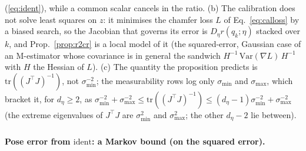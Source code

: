 \documentclass{article}
\newcommand{\ident}{\mathrm{ident}}
\newcommand{\ph}{\textsuperscript{\dag}}
\begin{document}
(\ref{eq:ident}), while a common scalar cancels in the ratio. (b) The calibration does not solve least squares on $z$: it minimises the chamfer loss $L$ of
Eq.~\ref{eq:calloss} by a biased search, so the Jacobian that governs its error is $D_\eta r(q_k;\eta)$ stacked over
$k$, and Prop.~\ref{prop:r2cr} is a local model of it (the squared-error, Gaussian case of an M-estimator whose
covariance is in general the sandwich $H^{-1}\,\mathrm{Var}(\nabla L)\,H^{-1}$ with $H$ the Hessian of $L$). (c) The
quantity the proposition predicts is $\mathrm{tr}((J^\top J)^{-1})$, not $\sigma_{\min}^{-2}$; the measurability rows log
only $\sigma_{\min}$ and $\sigma_{\max}$, which bracket it, for $d_\eta \ge 2$, as $\sigma_{\min}^{-2} +
\sigma_{\max}^{-2} \le \mathrm{tr}((J^\top J)^{-1}) \le (d_\eta-1)\sigma_{\min}^{-2} + \sigma_{\max}^{-2}$ (the extreme
eigenvalues of $J^\top J$ are $\sigma_{\min}^2$ and $\sigma_{\max}^2$; the other $d_\eta-2$ lie between).

\paragraph{Pose error from $\ident$: a Markov bound (on the squared error)\ph.}
\end{document}
